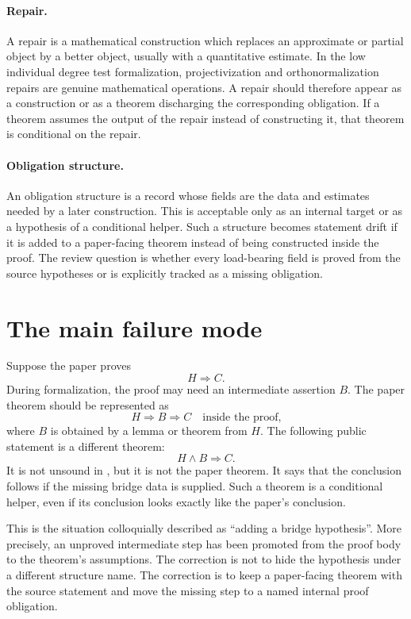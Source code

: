 \documentclass[11pt]{article}
\begin{document}
\paragraph{Repair.}
A repair is a mathematical construction which replaces an approximate or
partial object by a better object, usually with a quantitative estimate.  In
the low individual degree test formalization, projectivization and
orthonormalization repairs are genuine mathematical operations.  A repair
should therefore appear as a construction or as a theorem discharging the
corresponding obligation.  If a theorem assumes the output of the repair instead
of constructing it, that theorem is conditional on the repair.

\paragraph{Obligation structure.}
An obligation structure is a record whose fields are the data and estimates
needed by a later construction.  This is acceptable only as an internal target
or as a hypothesis of a conditional helper.  Such a structure becomes statement
drift if it is added to a paper-facing theorem instead of being constructed
inside the proof.  The review question is whether every load-bearing field is
proved from the source hypotheses or is explicitly tracked as a missing
obligation.

\section{The main failure mode}

Suppose the paper proves
\[
  H \Longrightarrow C.
\]
During formalization, the proof may need an intermediate assertion \(B\).  The
paper theorem should be represented as
\[
  H \Longrightarrow B \Longrightarrow C
  \quad\text{inside the proof,}
\]
where \(B\) is obtained by a lemma or theorem from \(H\).  The following
public statement is a different theorem:
\[
  H \land B \Longrightarrow C.
\]
It is not unsound in \Lean{}, but it is not the paper theorem.  It says that the
conclusion follows if the missing bridge data is supplied.  Such a theorem is a
conditional helper, even if its conclusion looks exactly like the paper's
conclusion.

This is the situation colloquially described as ``adding a bridge
hypothesis''.  More precisely, an unproved intermediate step has been promoted
from the proof body to the theorem's assumptions.  The correction is not to hide
the hypothesis under a different structure name.  The correction is to keep a
paper-facing theorem with the source statement and move the missing step to a
named internal proof obligation.
\end{document}
